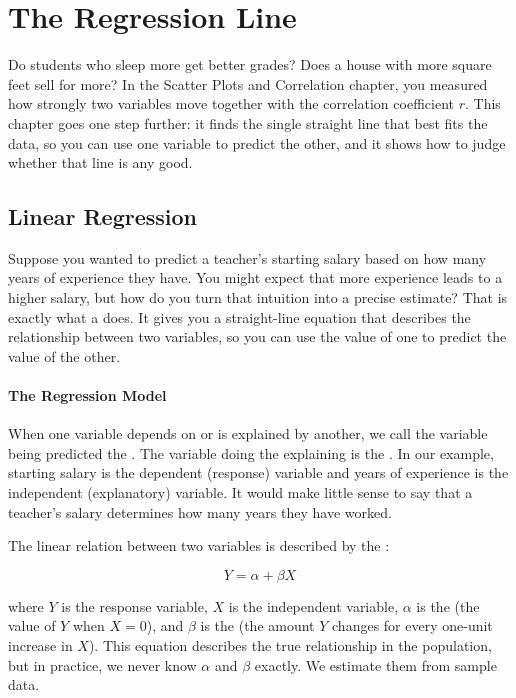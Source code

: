 \chapter{The Regression Line}

Do students who sleep more get better grades? Does a house with more square feet sell for more? In the
Scatter Plots and Correlation chapter, you measured how strongly two variables move together with the
correlation coefficient $r$. This chapter goes one step further: it finds the single straight line that best
fits the data, so you can use one variable to predict the other, and it shows how to judge whether that line
is any good.

\section{Linear Regression}

Suppose you wanted to predict a teacher's starting salary based on how many years
of experience they have. You might expect that more experience leads to a higher
salary, but how do you turn that intuition into a precise estimate? That is
exactly what a 
does. It gives you a straight-line equation that describes the relationship between
two variables, so you can use the value of one to predict the value of the other.

\subsubsection{The Regression Model}

When one variable depends on or is explained by another, we call the variable being
predicted the . The variable doing the
explaining is the . In our example,
starting salary is the dependent (response) variable and years of experience is
the independent (explanatory) variable. It would make little sense to say that a teacher's salary determines
how many years they have worked.

The linear relation between two variables is described by the
:

\[
Y = \alpha + \beta X
\]

where $Y$ is the response variable, $X$ is the independent variable, $\alpha$ is
the  (the value of $Y$ when $X = 0$),
and $\beta$ is the  (the amount $Y$ changes for every
one-unit increase in $X$). This equation describes the true relationship in the
population, but in practice, we never know $\alpha$ and $\beta$ exactly. We
estimate them from sample data.


